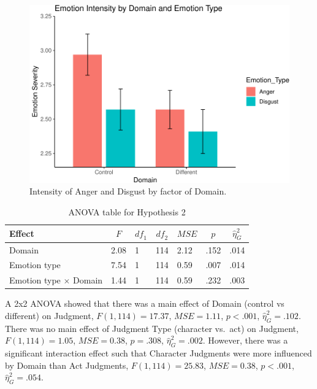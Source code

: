 \documentclass[man]{apa6}
\begin{document}
\begin{figure}
\centering
\includegraphics{APA_Report_files/figure-latex/unnamed-chunk-4-1.pdf}
\caption{\label{fig:unnamed-chunk-4}Intensity of Anger and Disgust by factor
of Domain.}
\end{figure}

\begin{table}[tbp]
\begin{center}
\begin{threeparttable}
\caption{\label{tab:anothatable}ANOVA table for Hypothesis 2}
\begin{tabular}{lllllll}
\toprule
Effect & \multicolumn{1}{c}{$F$} & \multicolumn{1}{c}{$\mathit{df}_1$} & \multicolumn{1}{c}{$\mathit{df}_2$} & \multicolumn{1}{c}{$\mathit{MSE}$} & \multicolumn{1}{c}{$p$} & \multicolumn{1}{c}{$\hat{\eta}^2_G$}\\
\midrule
Domain & 2.08 & 1 & 114 & 2.12 & .152 & .014\\
Emotion type & 7.54 & 1 & 114 & 0.59 & .007 & .014\\
Emotion type $\times$ Domain & 1.44 & 1 & 114 & 0.59 & .232 & .003\\
\bottomrule
\end{tabular}
\end{threeparttable}
\end{center}
\end{table}

A 2x2 ANOVA showed that there was a main effect of Domain (control vs
different) on Judgment, \(F(1, 114) = 17.37\), \(\mathit{MSE} = 1.11\),
\(p < .001\), \(\hat{\eta}^2_G = .102\). There was no main effect of
Judgment Type (character vs.~act) on Judgment, \(F(1, 114) = 1.05\),
\(\mathit{MSE} = 0.38\), \(p = .308\), \(\hat{\eta}^2_G = .002\).
However, there was a significant interaction effect such that Character
Judgments were more influenced by Domain than Act Judgments,
\(F(1, 114) = 25.83\), \(\mathit{MSE} = 0.38\), \(p < .001\),
\(\hat{\eta}^2_G = .054\).
\end{document}
